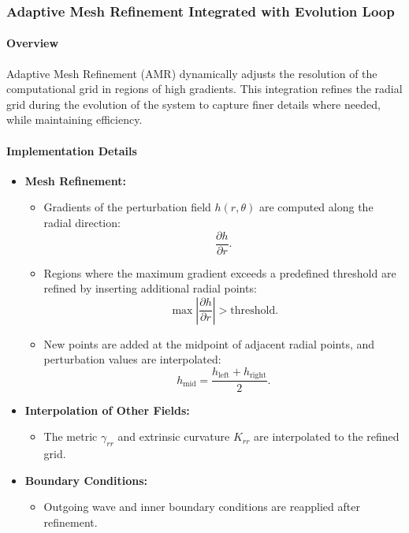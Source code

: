 \documentclass[12pt]{article}
\begin{document}
\subsubsection{Adaptive Mesh Refinement Integrated with Evolution Loop}

\paragraph{Overview}
Adaptive Mesh Refinement (AMR) dynamically adjusts the resolution of the computational grid in regions of high gradients. This integration refines the radial grid during the evolution of the system to capture finer details where needed, while maintaining efficiency.

\paragraph{Implementation Details}
\begin{itemize}
    \item \textbf{Mesh Refinement:}
    \begin{itemize}
        \item Gradients of the perturbation field $h(r, \theta)$ are computed along the radial direction:
        \[
        \frac{\partial h}{\partial r}.
        \]
        \item Regions where the maximum gradient exceeds a predefined threshold are refined by inserting additional radial points:
        \[
        \max \left| \frac{\partial h}{\partial r} \right| > \text{threshold}.
        \]
        \item New points are added at the midpoint of adjacent radial points, and perturbation values are interpolated:
        \[
        h_{\text{mid}} = \frac{h_{\text{left}} + h_{\text{right}}}{2}.
        \]
    \end{itemize}
    \item \textbf{Interpolation of Other Fields:}
    \begin{itemize}
        \item The metric $\gamma_{rr}$ and extrinsic curvature $K_{rr}$ are interpolated to the refined grid.
    \end{itemize}
    \item \textbf{Boundary Conditions:}
    \begin{itemize}
        \item Outgoing wave and inner boundary conditions are reapplied after refinement.
    \end{itemize}
\end{itemize}
\end{document}
